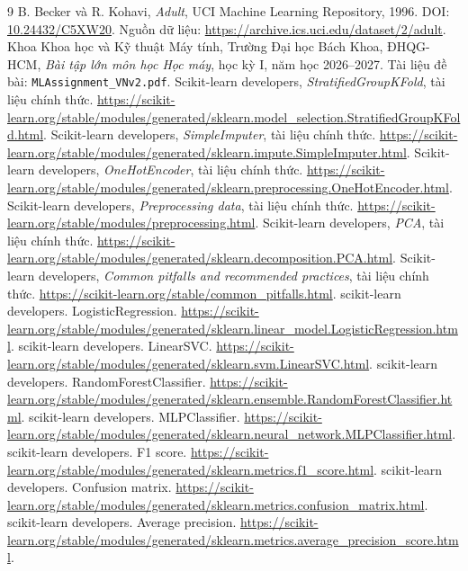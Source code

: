 \clearpage
{}
{}
\begin{thebibliography}{9}
B. Becker và R. Kohavi, \textit{Adult}, UCI Machine Learning Repository, 1996.
DOI: \href{https://doi.org/10.24432/C5XW20}{10.24432/C5XW20}.
Nguồn dữ liệu: \url{https://archive.ics.uci.edu/dataset/2/adult}.
Khoa Khoa học và Kỹ thuật Máy tính, Trường Đại học Bách Khoa, ĐHQG-HCM,
\textit{Bài tập lớn môn học Học máy}, học kỳ I, năm học 2026--2027.
Tài liệu đề bài: \texttt{MLAssignment\_VNv2.pdf}.
Scikit-learn developers, \textit{StratifiedGroupKFold}, tài liệu chính thức.
\url{https://scikit-learn.org/stable/modules/generated/sklearn.model_selection.StratifiedGroupKFold.html}.
Scikit-learn developers, \textit{SimpleImputer}, tài liệu chính thức.
\url{https://scikit-learn.org/stable/modules/generated/sklearn.impute.SimpleImputer.html}.
Scikit-learn developers, \textit{OneHotEncoder}, tài liệu chính thức.
\url{https://scikit-learn.org/stable/modules/generated/sklearn.preprocessing.OneHotEncoder.html}.
Scikit-learn developers, \textit{Preprocessing data}, tài liệu chính thức.
\url{https://scikit-learn.org/stable/modules/preprocessing.html}.
Scikit-learn developers, \textit{PCA}, tài liệu chính thức.
\url{https://scikit-learn.org/stable/modules/generated/sklearn.decomposition.PCA.html}.
Scikit-learn developers, \textit{Common pitfalls and recommended practices}, tài liệu chính thức.
\url{https://scikit-learn.org/stable/common_pitfalls.html}.
 scikit-learn developers. LogisticRegression. \url{https://scikit-learn.org/stable/modules/generated/sklearn.linear_model.LogisticRegression.html}.
 scikit-learn developers. LinearSVC. \url{https://scikit-learn.org/stable/modules/generated/sklearn.svm.LinearSVC.html}.
 scikit-learn developers. RandomForestClassifier. \url{https://scikit-learn.org/stable/modules/generated/sklearn.ensemble.RandomForestClassifier.html}.
 scikit-learn developers. MLPClassifier. \url{https://scikit-learn.org/stable/modules/generated/sklearn.neural_network.MLPClassifier.html}.
 scikit-learn developers. F1 score. \url{https://scikit-learn.org/stable/modules/generated/sklearn.metrics.f1_score.html}.
 scikit-learn developers. Confusion matrix. \url{https://scikit-learn.org/stable/modules/generated/sklearn.metrics.confusion_matrix.html}.
 scikit-learn developers. Average precision. \url{https://scikit-learn.org/stable/modules/generated/sklearn.metrics.average_precision_score.html}.
\end{thebibliography}
